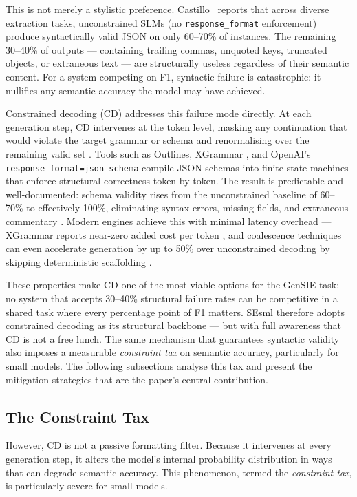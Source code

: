 \documentclass{ceurart}
\begin{document}
This is not merely a stylistic preference.
Castillo~\cite{Castillo2025} reports that across diverse extraction tasks,
unconstrained SLMs (no \texttt{response\_format} enforcement) produce syntactically
valid JSON on only 60--70\% of instances.
The remaining 30--40\% of outputs --- containing trailing commas, unquoted keys,
truncated objects, or extraneous text --- are structurally useless regardless of
their semantic content.
For a system competing on F1, syntactic failure is catastrophic: it nullifies any
semantic accuracy the model may have achieved.

Constrained decoding (CD) addresses this failure mode directly.
At each generation step, CD intervenes at the token level, masking any continuation
that would violate the target grammar or schema and renormalising over the remaining
valid set \cite{Willard2023, Geng2023}.
Tools such as Outlines, XGrammar \cite{Dong2024}, and OpenAI's
\texttt{response\_format=json\_schema} compile JSON schemas into finite-state machines
that enforce structural correctness token by token.
The result is predictable and well-documented: schema validity rises from the
unconstrained baseline of 60--70\% to effectively 100\%, eliminating syntax errors,
missing fields, and extraneous commentary \cite{Castillo2025}.
Modern engines achieve this with minimal latency overhead --- XGrammar reports
near-zero added cost per token \cite{Dong2024}, and coalescence techniques can even
accelerate generation by up to 50\% over unconstrained decoding by skipping
deterministic scaffolding \cite{Geng2025, Kurt2024}.

These properties make CD one of the most viable options for the GenSIE task: no system
that accepts 30--40\% structural failure rates can be competitive in a shared task
where every percentage point of F1 matters.
SEsml therefore adopts constrained decoding as its structural backbone --- but with
full awareness that CD is not a free lunch.
The same mechanism that guarantees syntactic validity also imposes a measurable
\emph{constraint tax} on semantic accuracy, particularly for small models.
The following subsections analyse this tax and present the mitigation strategies that
are the paper's central contribution.

\subsection{The Constraint Tax}

However, CD is not a passive formatting filter.
Because it intervenes at every generation step, it alters the model's internal
probability distribution in ways that can degrade semantic accuracy.
This phenomenon, termed the \emph{constraint tax}, is particularly severe for
small models.
\end{document}
